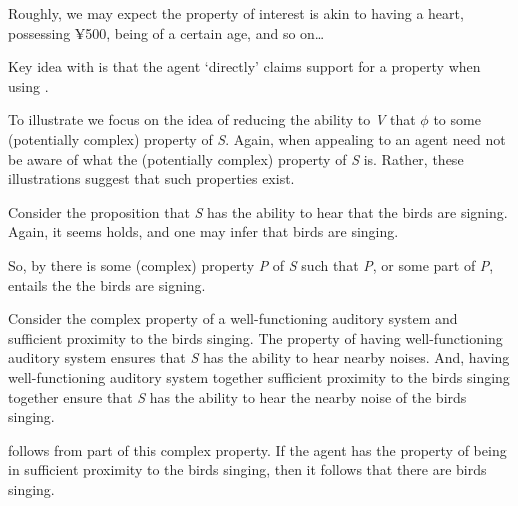 \begin{note}

  Roughly, we may expect the property of interest is akin to having a heart, possessing ¥500, being of a certain age, and so on\dots

  {
    \color{red}
    Key idea with \AR{} is that the agent `directly' claims support for a property when using .
  }

  To illustrate \AR{} we focus on the idea of reducing the ability to \emph{V} that \(\phi\) to some (potentially complex) property of \emph{S}.
  Again, when appealing to  an agent need not be aware of what the (potentially complex) property of \emph{S} is.
  Rather, these illustrations suggest that such properties exist.

  \begin{illustration}
    Consider the proposition that \emph{S} has the ability to hear that the birds are signing.
    Again, it seems  holds, and one may infer that birds are singing.

    So, by \AR{} there is some (complex) property \emph{P} of \emph{S} such that \emph{P}, or some part of \emph{P}, entails the the birds are signing.

    Consider the complex property of a well-functioning auditory system and sufficient proximity to the birds singing.
    The property of having well-functioning auditory system ensures that \emph{S} has the ability to hear nearby noises.
    And, having well-functioning auditory system together sufficient proximity to the birds singing together ensure that \emph{S} has the ability to hear the nearby noise of the birds singing.

     follows from part of this complex property.
    If the agent has the property of being in sufficient proximity to the birds singing, then it follows that there are birds singing.
  \end{illustration}


\end{note}
